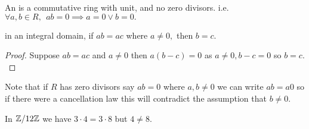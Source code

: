 \documentclass[a4paper]{article}
\begin{document}
\begin{definition}
    An  is a commutative ring with unit, and no zero divisors. i.e. $\forall a,b\in R,~~ab=0\implies a=0\lor b=0.$
\end{definition}
\begin{proposition}
     in an integral domain, if $ab=ac$ where $a\neq0,$ then $b=c.$
    \begin{proof}
        Suppose $ab=ac$ and $a\neq0$ then $a(b-c)=0$ as $a\neq 0,b-c=0$ so $b=c.$
    \end{proof}
\end{proposition}
Note that if $R$ has zero divisors say $ab=0$ where $a,b\neq0$ we can write $ab=a0$ so if there were a cancellation law this will contradict the assumption that $b\neq0.$

In $\mathbb{Z}/12\mathbb{Z}$ we have $3\cdot 4=3\cdot 8$ but $4\neq8.$
\end{document}
